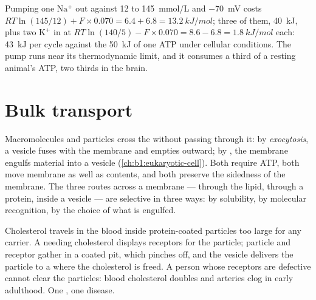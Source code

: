 \begin{example}\label{ex:b1:membranes-transport:pumpcost}
Pumping one $\mathrm{Na^+}$ out against \qty{12}{} to \qty{145}{mmol/L}
and \qty{-70}{mV} costs $RT\ln(145/12) + F\times 0.070 = 6.4 + 6.8 =
\qty{13.2}{kJ/mol}$; three of them, \qty{40}{kJ}, plus two
$\mathrm{K^+}$ in at $RT\ln(140/5) - F\times 0.070 = 8.6 - 6.8 =
\qty{1.8}{kJ/mol}$ each: \qty{43}{kJ} per cycle against the
\qty{50}{kJ} of one ATP under cellular conditions. The pump runs near
its thermodynamic limit, and it consumes a third of a resting animal's
ATP, two thirds in the brain.
\end{example}

\section{Bulk transport}

\begin{proposition}\label{prop:b1:membranes-transport:vesicles}
Macromolecules and particles cross the  without passing
through it: by \emph{exocytosis}, a vesicle fuses with the membrane and
empties outward; by \emph{}, the membrane engulfs material
into a vesicle (\cref{ch:b1:eukaryotic-cell}). Both require ATP, both
move membrane as well as contents, and both preserve the sidedness of
the membrane. The three routes across a membrane --- through the lipid,
through a protein, inside a vesicle --- are selective in three ways: by
solubility, by molecular recognition, by the choice of what is
engulfed.
\end{proposition}

\begin{example}\label{ex:b1:membranes-transport:ldl}
Cholesterol travels in the blood inside protein-coated particles too
large for any carrier. A  needing cholesterol displays receptors
for the particle; particle and receptor gather in a coated pit, which
pinches off, and the vesicle delivers the particle to a  where
the cholesterol is freed. A person whose receptors are defective
cannot clear the particles: blood cholesterol doubles and arteries
clog in early adulthood. One , one disease.
\end{example}


